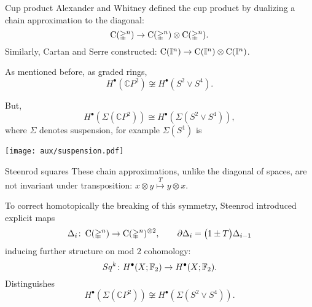 
\begin{frame}[fragile]{Cup product}
	\pause Alexander and Whitney defined the cup product by dualizing a chain approximation to the diagonal:
	\[
	\operatorname{C}(\mathbb{\Delta}^n) \to \operatorname{C}(\mathbb{\Delta}^n) \otimes \operatorname{C}(\mathbb{\Delta}^n).
	\]
	\pause Similarly, Cartan and Serre constructed: $\operatorname{C}(\mathbb{I}^n) \to \operatorname{C}(\mathbb{I}^n) \otimes \operatorname{C}(\mathbb{I}^n)$.

	\bigskip \pause
	As mentioned before, as graded rings,
	\[
	H^\bullet(\mathbb{C} P^2) \not\cong H^\bullet(S^2 \vee S^4).
	\]

	\vskip -8pt \pause But,
	\[
	H^\bullet(\Sigma(\mathbb{C} P^2)) \cong H^\bullet(\Sigma(S^2 \vee S^4)),
	\]
	where $\Sigma$ denotes suspension, for example $\Sigma(S^1)$ is
	\begin{center}
		\texttt{[image: aux/suspension.pdf]}
	\end{center}
\end{frame}

\begin{frame}{Steenrod squares}
	\pause These chain approximations, unlike the diagonal of spaces, are \textcolor{pblue}{not} invariant under transposition: $x \otimes y \stackrel{T}{\mapsto} y \otimes x$.
	\begin{center}
	\end{center}

	\medskip \pause To correct homotopically the breaking of this symmetry, Steenrod introduced explicit maps
	\[
	\Delta_i \colon \operatorname{C}(\mathbb{\Delta}^n) \to \operatorname{C}(\mathbb{\Delta}^n)^{\otimes 2},
	\qquad
	\partial \Delta_{i} = \big(1 \pm T \big) \Delta_{i-1}
	\]
	inducing further structure on mod 2 cohomology:
	\[
	Sq^k \colon H^\bullet(X; {\mathbb{F}_2}) \to H^\bullet(X; {\mathbb{F}_2}).
	\]
	\pause \textcolor{pblue}{Distinguishes}
	\[
	H^\bullet(\Sigma(\mathbb{C} P^2)) \not\cong H^\bullet(\Sigma(S^2 \vee S^4)).
	\]
\end{frame}

